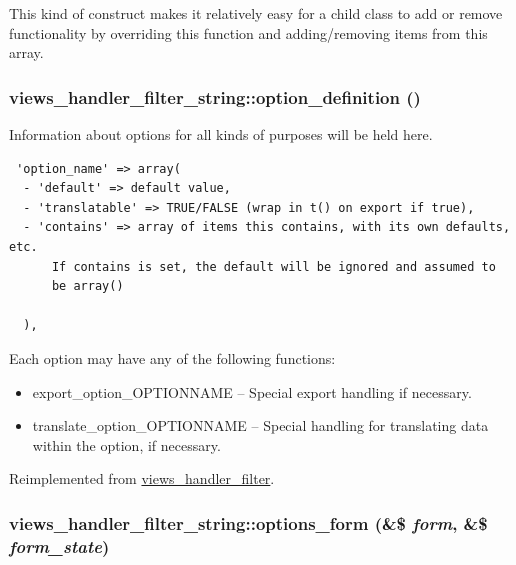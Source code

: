 This kind of construct makes it relatively easy for a child class to add or remove functionality by overriding this function and adding/removing items from this array. \hypertarget{classviews__handler__filter__string_12b7ca0453039900efde58e2c14bf0c8}{
\subsubsection[{option\_\-definition}]{\setlength{\rightskip}{0pt plus 5cm}views\_\-handler\_\-filter\_\-string::option\_\-definition ()}}
\label{classviews__handler__filter__string_12b7ca0453039900efde58e2c14bf0c8}


Information about options for all kinds of purposes will be held here. 

\begin{Code}\begin{verbatim} 'option_name' => array(
  - 'default' => default value,
  - 'translatable' => TRUE/FALSE (wrap in t() on export if true),
  - 'contains' => array of items this contains, with its own defaults, etc.
      If contains is set, the default will be ignored and assumed to
      be array()

  ),
\end{verbatim}
\end{Code}

 Each option may have any of the following functions:\begin{itemize}
\item export\_\-option\_\-OPTIONNAME -- Special export handling if necessary.\item translate\_\-option\_\-OPTIONNAME -- Special handling for translating data within the option, if necessary. \end{itemize}


Reimplemented from \hyperlink{classviews__handler__filter_053c9173084f1409a92eb390854ec304}{views\_\-handler\_\-filter}.\hypertarget{classviews__handler__filter__string_997cbe831f362c6d83a72b84471567fa}{
\subsubsection[{options\_\-form}]{\setlength{\rightskip}{0pt plus 5cm}views\_\-handler\_\-filter\_\-string::options\_\-form (\&\$ {\em form}, \/  \&\$ {\em form\_\-state})}}
\label{classviews__handler__filter__string_997cbe831f362c6d83a72b84471567fa}


